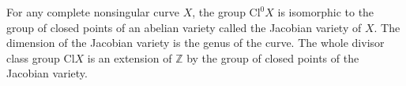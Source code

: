 For any complete nonsingular curve $X$, the group $\text{Cl}^0 X$ is isomorphic to the group of closed points of an abelian variety called the Jacobian variety of $X$. The dimension of the Jacobian variety is the genus of the curve. The whole divisor class group $\text{Cl} X$ is an extension of $\mathbb{Z}$ by the group of closed points of the Jacobian variety.
